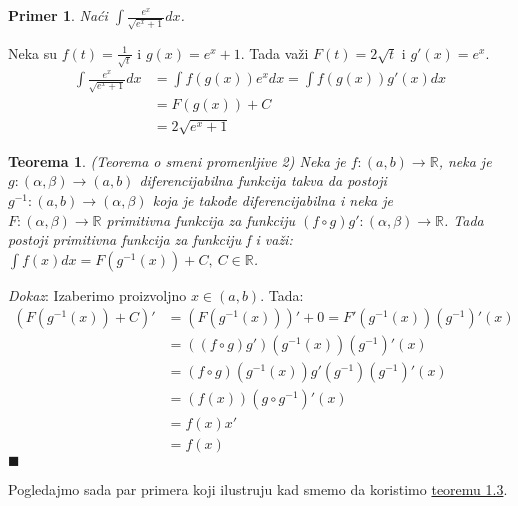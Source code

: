 \documentclass{article}
\newtheorem{teorema}{Teorema}[section]
\newtheorem{prim}{Primer}[section]
\begin{document}
\begin{primbox}
    \begin{prim}
        Naći $\int \frac{e^x}{\sqrt{e^x + 1}}dx$.
    \end{prim}
    Neka su $f(t) = \frac{1}{\sqrt{t}}$ i $g(x) = e^x+1$. Tada važi $F(t) = 2  \sqrt{t}$ i $g'(x) = e^x$.
    \begin{align*}
        \int\frac{e^x}{\sqrt{e^x + 1}}dx & = \int f(g(x))e^xdx = \int f(g(x))g'(x)dx
        \\ & = F(g(x)) + C
        \\ & = 2 \sqrt{ e^x+1}
    \end{align*}
\end{primbox}
\begin{teoremabox}
    \begin{teorema} \label{teorema_1.3}
        (Teorema o smeni promenljive 2)
        Neka je $f:(a, b) \longrightarrow \mathbb{R}$, neka je
        $g:(\alpha, \beta) \longrightarrow (a, b)$
        diferencijabilna funkcija takva da postoji
        $g^{-1}:(a,b) \longrightarrow (\alpha, \beta)$
        koja je takođe diferencijabilna i neka je \\
        $F:(\alpha, \beta) \longrightarrow \mathbb{R}$
        primitivna funkcija za funkciju
        $(f\circ g) g' : (\alpha, \beta) \longrightarrow \mathbb{R}$.
        Tada postoji primitivna funkcija za funkciju f i važi:
        $\int f(x) dx = F(g^{-1}(x)) + C,\ C \in \mathbb{R}$.
    \end{teorema}
\end{teoremabox}
\textit{Dokaz}: Izaberimo proizvoljno $x \in (a, b)$. Tada:
\begin{align*}
    (F(g^{-1}(x)) + C)' & = (F(g^{-1}(x)))' + 0 = F'(g^{-1}(x)) (g^{-1})'(x) \\
                        & = ((f\circ g) g')(g^{-1}(x)) (g^{-1})'(x)          \\
                        & = (f\circ g)(g^{-1}(x)) g'(g^{-1}) (g^{-1})'(x)    \\
                        & = (f(x)) (g \circ g^{-1})'(x)                      \\
                        & = f(x) x'                                          \\
                        & = f(x)
\end{align*}
\null\hfill $\blacksquare$\par
Pogledajmo sada par primera koji ilustruju kad smemo da
koristimo \hyperref[teorema_1.3]{teoremu 1.3}.\par
\end{document}
